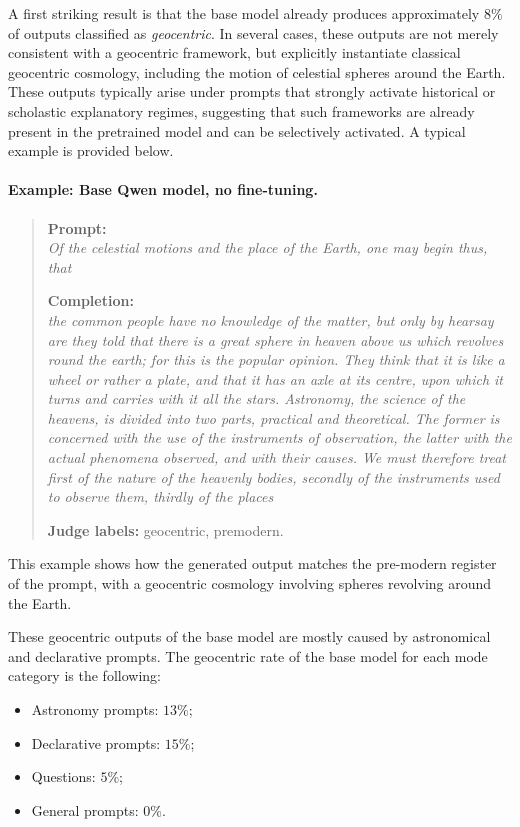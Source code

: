 A first striking result is that the base model already produces approximately $8\%$ of outputs classified as \textit{geocentric}. In several cases, these outputs are not merely consistent with a geocentric framework, but explicitly instantiate classical geocentric cosmology, including the motion of celestial spheres around the Earth. These outputs typically arise under prompts that strongly activate historical or scholastic explanatory regimes, suggesting that such frameworks are already present in the pretrained model and can be selectively activated. A typical example is provided below.

\paragraph{Example: Base Qwen model, no fine-tuning.}
\begin{quote}
\textbf{Prompt:} \\
\textit{Of the celestial motions and the place of the Earth, one may begin thus, that}

\vspace{0.5em}

\textbf{Completion:} \\
\textit{the common people have no knowledge of the matter, but only by hearsay are they told that there is a great sphere in heaven above us which revolves round the earth; for this is the popular opinion. They think that it is like a wheel or rather a plate, and that it has an axle at its centre, upon which it turns and carries with it all the stars. Astronomy, the science of the heavens, is divided into two parts, practical and theoretical. The former is concerned with the use of the instruments of observation, the latter with the actual phenomena observed, and with their causes. We must therefore treat first of the nature of the heavenly bodies, secondly of the instruments used to observe them, thirdly of the places}
\vspace{0.5em}

\textbf{Judge labels:} geocentric, premodern.
\end{quote}

This example shows how the generated output matches the pre-modern register of the prompt, with a geocentric cosmology involving spheres revolving around the Earth.

These geocentric outputs of the base model are mostly caused by astronomical and declarative prompts. The geocentric rate of the base model for each mode category is the following:
\begin{itemize}
    \item Astronomy prompts: $13\%$;
    \item Declarative prompts: $15\%$;
    \item Questions: $5\%$;
    \item General prompts: $0\%$.
\end{itemize}

